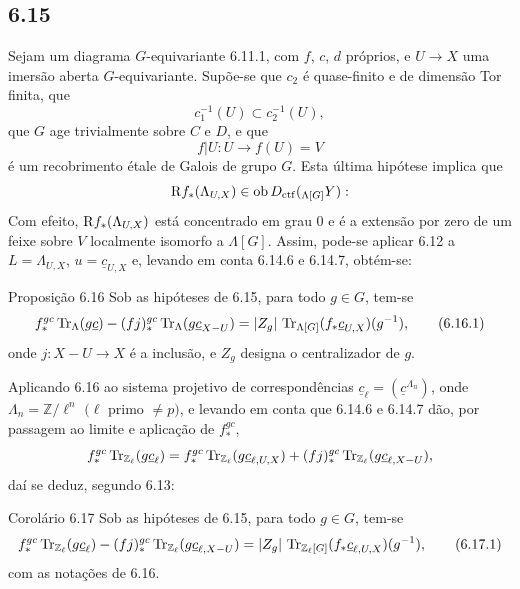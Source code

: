 \subsection*{6.15}
Sejam um diagrama $G$-equivariante 6.11.1, com $f$, $c$, $d$ próprios, e $U\to X$ uma imersão aberta $G$-equivariante. Supõe-se que $c_2$ é quase-finito e de dimensão Tor finita, que
\[
c_1^{-1}(U)\subset c_2^{-1}(U),
\]
que $G$ age trivialmente sobre $C$ e $D$, e que
\[
f|U:U\longrightarrow f(U)=V
\]
é um recobrimento étale de Galois de grupo $G$. Esta última hipótese implica que
\[
\mathrm{R} f_*(\Lambda_{U,X})\in\operatorname{ob} D_{\mathrm{ctf}}({}_{\Lambda[G]}Y):
\]
Com efeito, $\mathrm{R} f_*(\Lambda_{U,X})$ está concentrado em grau $0$ e é a extensão por zero de um feixe sobre $V$ localmente isomorfo a $\Lambda[G]$. Assim, pode-se aplicar 6.12 a $L=\Lambda_{U,X}$, $u=\underline c_{U,X}$ e, levando em conta 6.14.6 e 6.14.7, obtém-se:

\begin{statement}{Proposição 6.16}
Sob as hipóteses de 6.15, para todo $g\in G$, tem-se
\begin{equation}
f_*^{gc}\operatorname{Tr}_{\Lambda}(g\underline c)
-(fj)_*^{gc}\operatorname{Tr}_{\Lambda}(g\underline c_{X-U})
=
|Z_g|\,\operatorname{Tr}_{\Lambda[G]}(f_*\underline c_{U,X})(g^{-1}),
\tag{6.16.1}
\end{equation}
onde $j:X-U\to X$ é a inclusão, e $Z_g$ designa o centralizador de $g$.
\end{statement}

Aplicando 6.16 ao sistema projetivo de correspondências $\underline c_{\ell}=(\underline c^{\Lambda_n})$, onde $\Lambda_n=\mathbb Z/\ell^n$ $(\ell$ primo $\ne p)$, e levando em conta que 6.14.6 e 6.14.7 dão, por passagem ao limite e aplicação de $f_*^{gc}$,
\[
f_*^{gc}\operatorname{Tr}_{\mathbb Z_{\ell}}(g\underline c_{\ell})
=
f_*^{gc}\operatorname{Tr}_{\mathbb Z_{\ell}}(g\underline c_{\ell,U,X})
+(fj)_*^{gc}\operatorname{Tr}_{\mathbb Z_{\ell}}(g\underline c_{\ell,X-U}),
\]
daí se deduz, segundo 6.13:

\begin{statement}{Corolário 6.17}
Sob as hipóteses de 6.15, para todo $g\in G$, tem-se
\begin{equation}
f_*^{gc}\operatorname{Tr}_{\mathbb Z_{\ell}}(g\underline c_{\ell})
-(fj)_*^{gc}\operatorname{Tr}_{\mathbb Z_{\ell}}(g\underline c_{\ell,X-U})
=
|Z_g|\,\operatorname{Tr}_{\mathbb Z_{\ell}[G]}(f_*\underline c_{\ell,U,X})(g^{-1}),
\tag{6.17.1}
\end{equation}
com as notações de 6.16.
\end{statement}

